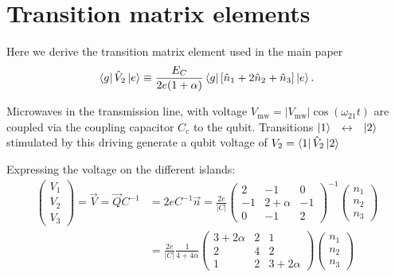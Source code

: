 \documentclass[%
superscriptaddress,
preprint,
preprintnumbers,
bibnotes,
amsmath,
amssymb,
aps,
showkeys,
prb,
]{revtex4-1}
\newcommand{\iket}[1]{\ensuremath{\Ket{#1}}}
\newcommand{\ibra}[1]{\ensuremath{\Bra{#1}}}
\newcommand{\iketbra}[2]{\ket{#1}\bra{#2}}
\newcommand{\iabs}[1]{\ensuremath{\left|#1\right|}}
\newcommand{\ilra}{\ensuremath{\,\leftrightarrow\,}}
\begin{document}

\section{Transition matrix elements}
\label{sec:trans-matr-elem}

\begin{framed}\noindent
  Here we derive the transition matrix element used in the main paper
      \begin{equation}
    \label{eq:dipole_voltage_6}
    \ibra{g}\hat{V}_2 \iket{e} \equiv \frac{E_{C}}{2 e (1+\alpha)}\ibra{g}\left[\hat{n}_1  +  2\hat{n}_{2}
        +\hat{n}_3 \right]\iket{e}.
  \end{equation}
\end{framed}

Microwaves   in  the  transmission  line,   with  voltage
$   V_{\text{mw}}=   \iabs{V_{\text{mw}}}\cos(\omega_{21   }t)   $  are   coupled   via the coupling capacitor
$C_{\text{c}}$  to   the  qubit. Transitions \iket{1}~\ilra~\iket{2} stimulated by
this driving  generate a qubit voltage  of $  V_2 = \ibra{1}\hat{V}_2\iket{2} $ 

Expressing the voltage on the different islands:
  \begin{equation}
    \label{eq:dipole_voltage_8}
    \begin{aligned}
      \begin{pmatrix}
        V_{1}\\V_{2}\\V_{3}
      \end{pmatrix}  =  \vec{V}  =   \vec{Q}C^{-1}  &  =2eC^{-1}\vec{n}  =  \frac{2e}{\iabs{C}
      }\begin{pmatrix}
          2 & -1 & 0\\
          -1 & 2 + \alpha & -1\\
          0 & -1 & 2
        \end{pmatrix}^{-1} \begin{pmatrix} n_{1}\\n_{2}\\n_{3}
      \end{pmatrix}\\
      & = \frac{2e}{\iabs{C}} \frac{1}{4 + 4\alpha}\begin{pmatrix}
          3 + 2\alpha & 2 & 1\\
          2 & 4 & 2\\
          1 & 2 & 3+2\alpha
        \end{pmatrix} \begin{pmatrix} n_{1}\\n_{2}\\n_{3}
      \end{pmatrix}
          \end{aligned}
  \end{equation}
\end{document}
